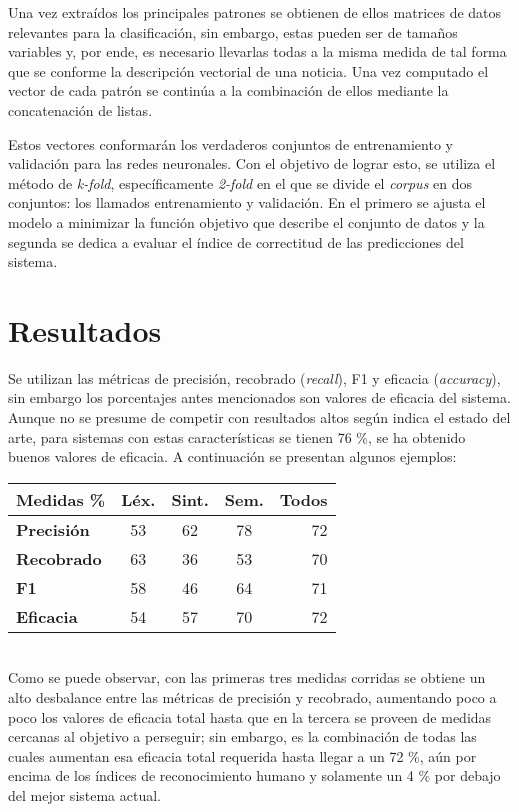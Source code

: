 \documentclass{llncs}
\begin{document}
\begin{multicols}{2}[]
Una vez extra\'idos los principales patrones se obtienen de ellos matrices de datos relevantes para la clasificaci\'on, sin embargo, estas pueden ser de tama\~nos variables y, por ende,
es necesario llevarlas todas a la misma medida de tal forma que se conforme la descripci\'on vectorial de una noticia. Una vez computado el vector de cada patr\'on se contin\'ua a la 
combinaci\'on de ellos mediante la concatenaci\'on de listas.

Estos vectores conformar\'an los verdaderos conjuntos de entrenamiento y validaci\'on para las redes neuronales. Con el objetivo de lograr esto, se utiliza el m\'etodo de \textit{k-fold},
espec\'ificamente \textit{2-fold} en el que se divide el \textit{corpus} en dos conjuntos: los llamados entrenamiento y validaci\'on. En el primero se ajusta el modelo a minimizar la funci\'on
objetivo que describe el conjunto de datos y la segunda se dedica a evaluar el \'indice de correctitud de las predicciones del sistema.

\section{Resultados}

Se utilizan las m\'etricas de precisi\'on, recobrado (\textit{recall}), F1 y eficacia (\textit{accuracy}), sin embargo los porcentajes antes mencionados son valores de eficacia del sistema.
Aunque no se presume de competir con resultados altos seg\'un indica el estado del arte, para sistemas con estas caracter\'isticas se tienen 76 \%, se ha obtenido buenos valores de eficacia. A continuaci\'on se presentan algunos ejemplos:\\

\begin{tabular}{l|c|c|c|r} %
	\hline
	\textbf{Medidas \%} & \textbf{L\'ex.} & \textbf{Sint.} & \textbf{Sem.} & \textbf{Todos}\\
	\hline
	\textbf{Precisi\'on} & 53 & 62 & 78 & 72\\
	\hline
	\textbf{Recobrado} & 63 & 36 & 53 & 70\\
	\hline
	\textbf{F1} & 58 & 46 & 64 & 71\\
	\hline
	\textbf{Eficacia} & 54 & 57 & 70 & 72\\
	\hline
\end{tabular}\\

Como se puede observar, con las primeras tres medidas corridas se obtiene un alto desbalance entre las m\'etricas de precisi\'on y recobrado, aumentando poco a poco los valores de
eficacia total hasta que en la tercera se proveen de medidas cercanas al objetivo a perseguir; sin embargo, es la combinaci\'on de todas las cuales aumentan esa eficacia total requerida
hasta llegar a un 72 \%, a\'un por encima de los \'indices de reconocimiento humano y solamente un 4 \% por debajo del mejor sistema actual.
\end{multicols}



\end{document}
